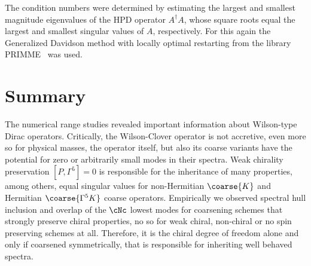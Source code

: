 The condition numbers were determined by estimating the largest and smallest magnitude eigenvalues of the HPD operator $A^{\dagger} A$, whose square roots equal the largest and smallest singular values of $A$, respectively.
For this again the Generalized Davidson method with locally optimal restarting from the library PRIMME~\cite{primme} was used.












\section{Summary}
\label{sec:chirality:summary}



The numerical range studies revealed important information about Wilson-type Dirac operators.
Critically, the Wilson-Clover operator is not accretive, even more so for physical masses, \ie the operator itself, but also its coarse variants have the potential for zero or arbitrarily small modes in their spectra.
Weak chirality preservation $[P, \Gamma^{5}]=0$ is responsible for the inheritance of many properties, among others, equal singular values for non-Hermitian $\coarse{K}$ and Hermitian $\coarse{\Gamma^{5} K}$ coarse operators.
Empirically we observed spectral hull inclusion and overlap of the $\cNc$ lowest modes for coarsening schemes that strongly preserve chiral properties, no so for weak chiral, non-chiral or no spin preserving schemes at all.
Therefore, it is the chiral degree of freedom alone and only if coarsened symmetrically, that is responsible for inheriting well behaved spectra.

